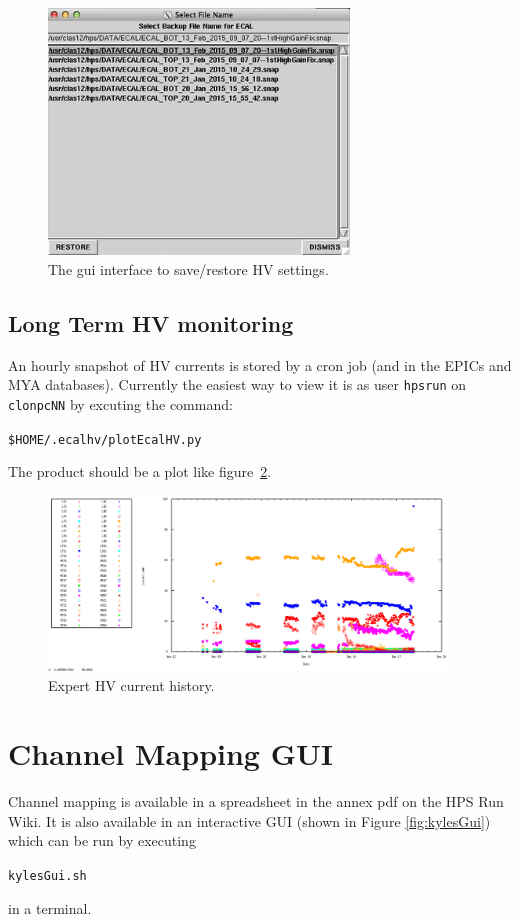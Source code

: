 \documentclass[12pt]{article}
\begin{document}
\begin{figure}[htbp]\centering
    \includegraphics[width=8cm]{pics/hvrestore.png}
    \caption{The gui interface to save/restore HV settings.  \label{fig:hvrestore}}
\end{figure}

   \subsection{Long Term HV monitoring}

   An hourly snapshot of HV currents is stored by a cron job (and in the EPICs and MYA databases).  Currently the easiest way to view it is as user \texttt{hpsrun} on \texttt{clonpcNN} by excuting the command:
   \begin{center}
   \texttt{\$HOME/.ecalhv/plotEcalHV.py}
   \end{center}
The product should be a plot like figure~\ref{HVhistory}.

\begin{figure}[htbp] \centering
\includegraphics[width=0.95\textwidth]{pics/ECALHVCURRENTS_2014_12_20.png}
\caption{ \label{HVhistory} Expert HV current history.}
\end{figure}

\section{Channel Mapping GUI}
Channel mapping is available in a spreadsheet in the annex pdf on the HPS Run Wiki. It is also available in an interactive GUI (shown in Figure \ref{fig:kylesGui}) which can be run by executing \begin{center}\texttt{kylesGui.sh}\end{center} in a terminal.
\end{document}
